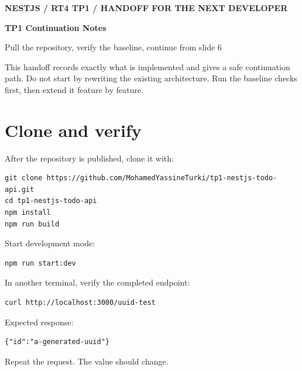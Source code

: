 
\thispagestyle{empty}
{\small\bfseries\color{teal} NESTJS / RT4 TP1 / HANDOFF FOR THE NEXT DEVELOPER}\par\vspace{10mm}
{\fontsize{31}{35}\selectfont\bfseries TP1 Continuation Notes\par}\vspace{4mm}
{\Large Pull the repository, verify the baseline, continue from slide 6\par}
\par\vspace{8mm}
This handoff records exactly what is implemented and gives a safe continuation path. Do not start by rewriting the existing architecture. Run the baseline checks first, then extend it feature by feature.

\section{Clone and verify}
After the repository is published, clone it with:
\begin{lstlisting}[language={}]
git clone https://github.com/MohamedYassineTurki/tp1-nestjs-todo-api.git
cd tp1-nestjs-todo-api
npm install
npm run build
\end{lstlisting}
Start development mode:
\begin{lstlisting}[language={}]
npm run start:dev
\end{lstlisting}
In another terminal, verify the completed endpoint:
\begin{lstlisting}[language={}]
curl http://localhost:3000/uuid-test
\end{lstlisting}
Expected response:
\begin{lstlisting}[language={}]
{"id":"a-generated-uuid"}
\end{lstlisting}
Repeat the request. The value should change.

